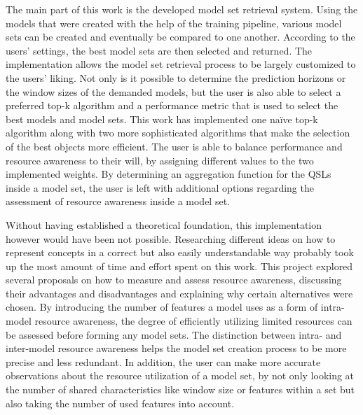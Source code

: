 The main part of this work is the developed model set retrieval system. Using the models that were created with the help of the training pipeline, various model sets can be created and eventually be compared to one another. According to the users’ settings, the best model sets are then selected and returned. The implementation allows the model set retrieval process to be largely customized to the users’ liking. Not only is it possible to determine the prediction horizons or the window sizes of the demanded models, but the user is also able to select a preferred top-k algorithm and a performance metric that is used to select the best models and model sets. This work has implemented one naïve top-k algorithm along with two more sophisticated algorithms that make the selection of the best objects more efficient. The user is able to balance performance and resource awareness to their will, by assigning different values to the two implemented weights. By determining an aggregation function for the QSLs inside a model set, the user is left with additional options regarding the assessment of resource awareness inside a model set.


Without having established a theoretical foundation, this implementation however would have been not possible. Researching different ideas on how to represent concepts in a correct but also easily understandable way probably took up the most amount of time and effort spent on this work. This project explored several proposals on how to measure and assess resource awareness, discussing their advantages and disadvantages and explaining why certain alternatives were chosen. By introducing the number of features a model uses as a form of intra-model resource awareness, the degree of efficiently utilizing limited resources can be assessed before forming any model sets. The distinction between intra- and inter-model resource awareness helps the model set creation process to be more precise and less redundant. In addition, the user can make more accurate observations about the resource utilization of a model set, by not only looking at the number of shared characteristics like window size or features within a set but also taking the number of used features into account.


